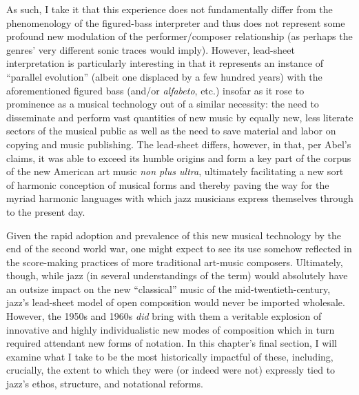     As such, I take it that this experience does not fundamentally differ from the phenomenology of the figured-bass interpreter and thus does not represent some profound new modulation of the performer/composer relationship (as perhaps the genres' very different sonic traces would imply). However, lead-sheet interpretation is particularly interesting in that it represents an instance of ``parallel evolution'' (albeit one displaced by a few hundred years) with the aforementioned figured bass (and/or \textit{alfabeto}, etc.) insofar as it rose to prominence as a musical technology out of a similar necessity: the need to disseminate and perform vast quantities of new music by equally new, less literate sectors of the musical public as well as the need to save material and labor on copying and music publishing. The lead-sheet differs, however, in that, per Abel's claims, it was able to exceed its humble origins and form a key part of the corpus of the new American art music \textit{non plus ultra}, ultimately facilitating a new sort of harmonic conception of musical forms and thereby paving the way for the myriad harmonic languages with which jazz musicians express themselves through to the present day.

    Given the rapid adoption and prevalence of this new musical technology by the end of the second world war, one might expect to see its use somehow reflected in the score-making practices of more traditional art-music composers. Ultimately, though, while jazz (in several understandings of the term) would absolutely have an outsize impact on the new ``classical'' music of the mid-twentieth-century, jazz's lead-sheet model of open composition would never be imported wholesale. However, the 1950s and 1960s \textit{did} bring with them a veritable explosion of innovative and highly individualistic new modes of composition which in turn required attendant new forms of notation. In this chapter's final section, I will examine what I take to be the most historically impactful of these, including, crucially, the extent to which they were (or indeed were not) expressly tied to jazz's ethos, structure, and notational reforms.

   

